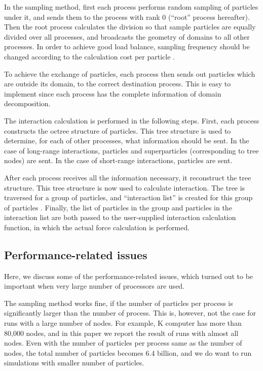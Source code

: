 \documentclass[dvipdfmx]{acm_proc_article-sp}
\begin{document}
In the sampling method, first each process performs random sampling of
particles under it, and sends them to the process with rank 0
(``root'' process hereafter). Then the root process calculates the
division so that sample particles are equally divided over all
processes, and broadcasts the geometry of domains to all other
processes. In order to achieve good load balance, sampling frequency
should be changed according to the calculation cost per particle
\cite{ishiyama:greem}.

To achieve the exchange of particles,
each  process then sends out particles which are outside its domain,
to the correct destination process. This is easy to implement since 
each process has the complete information of domain decomposition. 

The interaction calculation is performed in the following steps.
First, each process constructs the octree structure of particles. This
tree structure is used to determine, for each of other processes, what
information should be sent. In the case of long-range interactions,
particles and superparticles (corresponding to tree nodes) are
sent. In the case of short-range interactions, particles are sent.

After each process receives all the information necessary, it
reconstruct the tree structure. This tree structure is now used to
calculate interaction. The tree is traversed for a group of particles,
and ``interaction list'' is created for this group of particles
\cite{1990JCoPh..87..161B}. Finally, the list of particles
in the group and particles in the interaction list are both passed to
the user-supplied interaction calculation function, in which the
actual force calculation is performed.


\subsection{Performance-related issues}

Here, we discuss some of the performance-related issues, which turned
out to be important when very large number of processors are used. 

The sampling method works fine, if the number of particles per process
is significantly larger than the number of process. This is, however,
not the case for runs with a large number of nodes.  For example, K
computer has more than 80,000 nodes, and in this paper we report the
result of runs with almost all nodes. Even with the number of
particles per process same as the number of nodes, the total number of
particles becomes 6.4 billion, and we do want to run simulations with
smaller number of particles.
\end{document}
